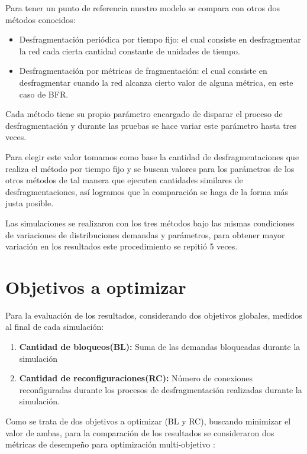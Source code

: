 Para tener un punto de referencia nuestro modelo se compara con otros dos métodos conocidos:
\begin{itemize}[a)]
    \item Desfragmentación periódica por tiempo fijo: el cual consiste en desfragmentar la red cada cierta cantidad constante de unidades de tiempo.
    \item Desfragmentación por métricas de fragmentación: el cual consiste en desfragmentar cuando la red alcanza cierto valor de alguna métrica, en este caso de BFR.
\end{itemize}

Cada método tiene su propio parámetro encargado de disparar el proceso de desfragmentación y durante las pruebas se hace variar este parámetro hasta tres veces. 

Para elegir este valor tomamos como base la cantidad de desfragmentaciones que realiza el método por tiempo fijo y se buscan valores para los parámetros de los otros métodos de tal manera que ejecuten cantidades similares de desfragmentaciones, así logramos que la comparación se haga de la forma más justa posible.

Las simulaciones se realizaron con los tres métodos bajo las mismas condiciones de variaciones de distribuciones demandas y parámetros, para obtener mayor variación en los resultados este procedimiento se repitió 5 veces.

\section{Objetivos a optimizar}

Para la evaluación de los resultados, considerando dos objetivos globales, medidos al final de cada simulación:

\begin{enumerate}[Obj. 1)]
    \item \textbf{Cantidad de bloqueos(BL):} Suma de las demandas bloqueadas durante la simulación
    \item \textbf{Cantidad de reconfiguraciones(RC):} Número de conexiones reconfiguradas durante los procesos de desfragmentación realizadas durante la simulación. 
\end{enumerate}

Como se trata de dos objetivos a optimizar (BL y RC), buscando minimizar el valor de ambas, para la comparación de los resultados se consideraron dos métricas de desempeño para optimización multi-objetivo \cite{von2014survey}: 

